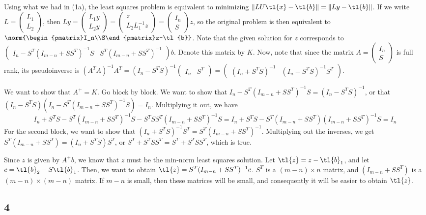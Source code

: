 \documentclass{article}
\newcommand{\openm}{\begin{pmatrix}}
\newcommand{\closem}{\end{pmatrix}}
\begin{document}
Using what we had in (1a), the least squares problem is equivalent to minimizing $\|LU\tl{x}-\tl{b}\|=\|Ly-\tl{b}\|$. If we write $L=\openm L_1\\L_2\closem$, then $Ly=\openm L_1y\\L_2y\closem=\openm z\\L_2L_1^{-1}z\closem=\openm I_n\\S\closem z$, so the original problem is then equivalent to $\norm{\openm I_n\\S\closem z-\tl{b}}$. 
Note that the given solution for $z$ corresponds to $\openm I_n-S^T(I_{m-n}+SS^T)^{-1}S&S^T(I_{m-n}+SS^T)^{-1}\closem b$. Denote this matrix by $K$. Now, note that since the matrix $A=\openm I_n\\S\closem$ is full rank, its pseudoinverse is $(A^TA)^{-1}A^T=(I_n-S^TS)^{-1}\openm I_n&S^T\closem=\openm(I_n+S^TS)^{-1}&(I_n-S^TS)^{-1}S^T\closem$.

We want to show that $A^+=K$. Go block by block. We want to show that $I_n-S^T(I_{m-n}+SS^T)^{-1}S=(I_n-S^TS)^{-1}$, or that $(I_n-S^TS)(I_n-S^T(I_{m-n}+SS^T)^{-1}S)=I_n$. Multiplying it out, we have
\[I_n+S^TS-S^T(I_{m-n}+SS^T)^{-1}S-S^TSS^T(I_{m-n}+SS^T)^{-1}S=I_n+S^TS-S^T(I_{m-n}+SS^T)(I_{m-n}+SS^T)^{-1}S=I_n\]
For the second block, we want to show that $(I_n+S^TS)^{-1}S^T=S^T(I_{m-n}+SS^T)^{-1}$. Multiplying out the inverses, we get $S^T(I_{m-n}+SS^T)=(I_n+S^TS)S^T$, or $S^T+S^TSS^T=S^T+S^TSS^T$, which is true.

Since $z$ is given by $A^+b$, we know that $z$ must be the min-norm least squares solution.
Let $\tl{z}=z-\tl{b}_1$, and let $c=\tl{b}_2-S\tl{b}_1$. Then, we want to obtain $\tl{z}=S^T(I_{m-n}+SS^T)^{-1}c$. $S^T$ is a $(m-n)\times n$ matrix, and $(I_{m-n}+SS^T)$ is a $(m-n)\times(m-n)$ matrix. If $m-n$ is small, then these matrices will be small, and consequently it will be easier to obtain $\tl{z}$.
\subsection*{4}
\end{document}
